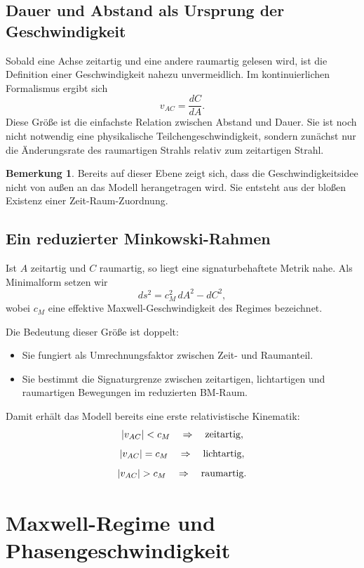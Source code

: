 \documentclass[11pt,a4paper]{article}
\theoremstyle{definition}
\newtheorem{bemerkung}[definition]{Bemerkung}
\theoremstyle{plain}
\begin{document}
	\subsection{Dauer und Abstand als Ursprung der Geschwindigkeit}
	
	Sobald eine Achse zeitartig und eine andere raumartig gelesen wird, ist die Definition einer Geschwindigkeit nahezu unvermeidlich. Im kontinuierlichen Formalismus ergibt sich
	\[
	v_{AC} = \frac{dC}{dA}.
	\]
	Diese Größe ist die einfachste Relation zwischen Abstand und Dauer. Sie ist noch nicht notwendig eine physikalische Teilchengeschwindigkeit, sondern zunächst nur die Änderungsrate des raumartigen Strahls relativ zum zeitartigen Strahl.
	
	\begin{bemerkung}
		Bereits auf dieser Ebene zeigt sich, dass die Geschwindigkeitsidee nicht von außen an das Modell herangetragen wird. Sie entsteht aus der bloßen Existenz einer Zeit-Raum-Zuordnung.
	\end{bemerkung}
	
	\subsection{Ein reduzierter Minkowski-Rahmen}
	
	Ist $A$ zeitartig und $C$ raumartig, so liegt eine signaturbehaftete Metrik nahe. Als Minimalform setzen wir
	\[
	ds^2 = c_M^2\, dA^2 - dC^2,
	\]
	wobei $c_M$ eine effektive Maxwell-Geschwindigkeit des Regimes bezeichnet.
	
	Die Bedeutung dieser Größe ist doppelt:
	\begin{itemize}[leftmargin=2em]
		\item Sie fungiert als Umrechnungsfaktor zwischen Zeit- und Raumanteil.
		\item Sie bestimmt die Signaturgrenze zwischen zeitartigen, lichtartigen und raumartigen Bewegungen im reduzierten BM-Raum.
	\end{itemize}
	
	Damit erhält das Modell bereits eine erste relativistische Kinematik:
	\[
	\abs{v_{AC}} < c_M \quad \Rightarrow \quad \text{zeitartig},
	\]
	\[
	\abs{v_{AC}} = c_M \quad \Rightarrow \quad \text{lichtartig},
	\]
	\[
	\abs{v_{AC}} > c_M \quad \Rightarrow \quad \text{raumartig}.
	\]
	
	\section{Maxwell-Regime und Phasengeschwindigkeit}
	
\end{document}
